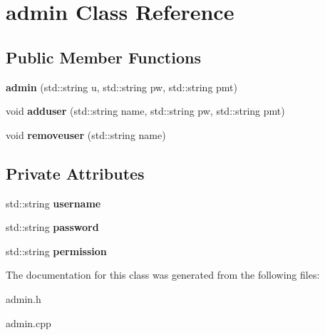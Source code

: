 \hypertarget{classadmin}{}\section{admin Class Reference}
\label{classadmin}
\subsection*{Public Member Functions}
\begin{DoxyCompactItemize}
\item 
\mbox{\label{classadmin_a36465416dfdeaa04a1bc52986b82bce9}} 
{\bfseries admin} (std\+::string u, std\+::string pw, std\+::string pmt)
\item 
\mbox{\label{classadmin_a810dc7750529ad997f327d1bf92a8edb}} 
void {\bfseries adduser} (std\+::string name, std\+::string pw, std\+::string pmt)
\item 
\mbox{\label{classadmin_af7562a79aab66070c83268eee18aab39}} 
void {\bfseries removeuser} (std\+::string name)
\end{DoxyCompactItemize}
\subsection*{Private Attributes}
\begin{DoxyCompactItemize}
\item 
\mbox{\label{classadmin_a34bf932e28dab561da4faa99bd5160be}} 
std\+::string {\bfseries username}
\item 
\mbox{\label{classadmin_a27b3c5a58e03a9f4197582b275941762}} 
std\+::string {\bfseries password}
\item 
\mbox{\label{classadmin_a3631de0dc2e529ce9613487d20ab8893}} 
std\+::string {\bfseries permission}
\end{DoxyCompactItemize}


The documentation for this class was generated from the following files\+:\begin{DoxyCompactItemize}
\item 
admin.\+h\item 
admin.\+cpp\end{DoxyCompactItemize}
